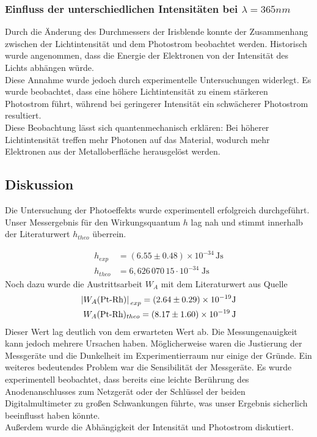 \documentclass{article}
\begin{document}
\subsubsection*{Einfluss der unterschiedlichen Intensitäten bei $\lambda = 365nm$}
Durch die Änderung des Durchmessers der Irisblende konnte der Zusammenhang zwischen
 der Lichtintensität und dem Photostrom beobachtet werden. Historisch wurde angenommen,
  dass die Energie der Elektronen von der Intensität des Lichts abhängen würde.\\
Diese Annahme wurde jedoch durch experimentelle Untersuchungen widerlegt.
 Es wurde beobachtet, dass eine höhere Lichtintensität zu einem stärkeren Photostrom führt,
  während bei geringerer Intensität ein schwächerer Photostrom resultiert.\\
Diese Beobachtung lässt sich quantenmechanisch erklären: Bei höherer Lichtintensität 
treffen mehr Photonen auf das Material, wodurch mehr Elektronen aus der Metalloberfläche 
herausgelöst werden.

\subsection{Diskussion}

Die Untersuchung der Photoeffekts wurde experimentell erfolgreich durchgeführt. Unser
Messergebnis für den Wirkungsquantum $h$ lag nah und stimmt innerhalb der Literaturwert $h_{theo}$ 
überrein.

\begin{align}
  h_{exp} &= (6.55 \pm 0.48) \times 10^{-34} \, \mathrm{Js}\\
  \displaystyle h_{theo} &= 6{,}626\,070\,15\cdot 10^{-34}\;\mathrm {Js} 
\end{align}
Noch dazu wurde die Austrittsarbeit $W_A$ mit dem Literaturwert aus Quelle \cite{surface-science}
\begin{align}
  \abs*{W_A (\text{Pt-Rh})}_{exp} = (2.64 \pm 0.29) \times 10^{-19}\text{J} \\
  W_A (\text{Pt-Rh})_{theo} = (8.17 \pm 1.60) \times 10^{-19} \, \text{J} 
\end{align}
Dieser Wert lag deutlich von dem erwarteten Wert ab. Die Messungenauigkeit kann jedoch 
mehrere Ursachen haben. Möglicherweise waren die Justierung der Messgeräte und die 
Dunkelheit im Experimentierraum nur einige der Gründe. Ein weiteres bedeutendes Problem 
war die Sensibilität der Messgeräte. Es wurde experimentell beobachtet, dass bereits eine 
leichte Berührung des Anodenanschlusses zum Netzgerät oder der Schlüssel der beiden 
Digitalmultimeter zu großen Schwankungen führte, was unser Ergebnis sicherlich 
beeinflusst haben könnte.
\\ Außerdem wurde die Abhängigkeit der Intensität und Photostrom diskutiert. 
\end{document}
